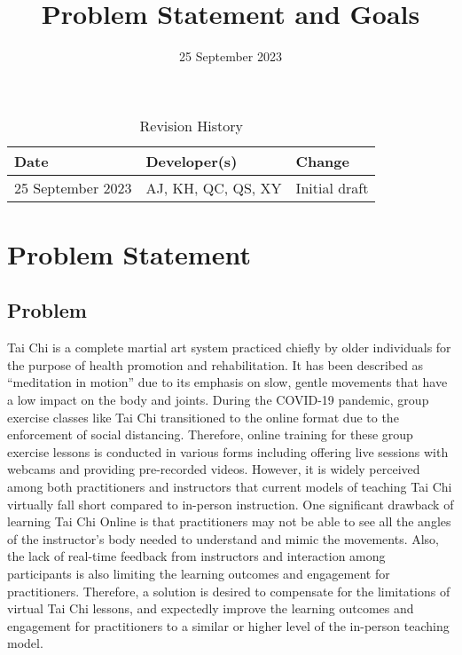 \documentclass{article}
\title{Problem Statement and Goals\\\progname}
\author{\authname}
\date{25 September 2023}
\begin{document}
\maketitle

\begin{table}[hp]
  \caption{Revision History} \label{TblRevisionHistory}
  \begin{tabularx}{\textwidth}{llX}
    \toprule
    \textbf{Date} & \textbf{Developer(s)} & \textbf{Change}\\
    \midrule
    25 September 2023 & AJ, KH, QC, QS, XY & Initial draft \\
    \bottomrule
  \end{tabularx}
\end{table}

\section{Problem Statement}

\subsection{Problem}

Tai Chi is a complete martial art system practiced chiefly by older individuals
for the purpose of health promotion and rehabilitation. It has been described as
“meditation in motion” due to its emphasis on slow, gentle movements that have a
low impact on the body and joints. During the COVID-19 pandemic, group exercise
classes like Tai Chi transitioned to the online format due to the enforcement of
social distancing. Therefore, online training for these group exercise lessons
is conducted in various forms including offering live sessions with webcams and
providing pre-recorded videos. However, it is widely perceived among both
practitioners and instructors that current models of teaching Tai Chi virtually
fall short compared to in-person instruction. One significant drawback of
learning Tai Chi Online is that practitioners may not be able to see all the
angles of the instructor’s body needed to understand and mimic the movements.
Also, the lack of real-time feedback from instructors and interaction among
participants is also limiting the learning outcomes and engagement for
practitioners. Therefore, a solution is desired to compensate for the
limitations of virtual Tai Chi lessons, and expectedly improve the learning
outcomes and engagement for practitioners to a similar or higher level of the
in-person teaching model.
\end{document}
